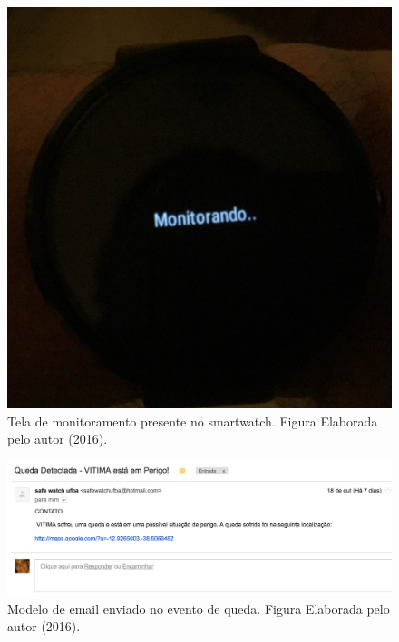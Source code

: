\begin{figure}
	\centering
	\includegraphics[scale=0.1]{imagens/screen_monitor.png}
	\caption{ Tela de monitoramento presente no smartwatch. Figura Elaborada pelo autor (2016).}
	\label{fig:monitor_screen}
\end{figure}


\begin{figure}[ht]
	\centering
	\includegraphics[scale=0.6]{imagens/mail_example.png}
	\caption{ Modelo de email enviado no evento de queda. Figura Elaborada pelo autor (2016).}
	\label{fig:mail_template}
\end{figure}

